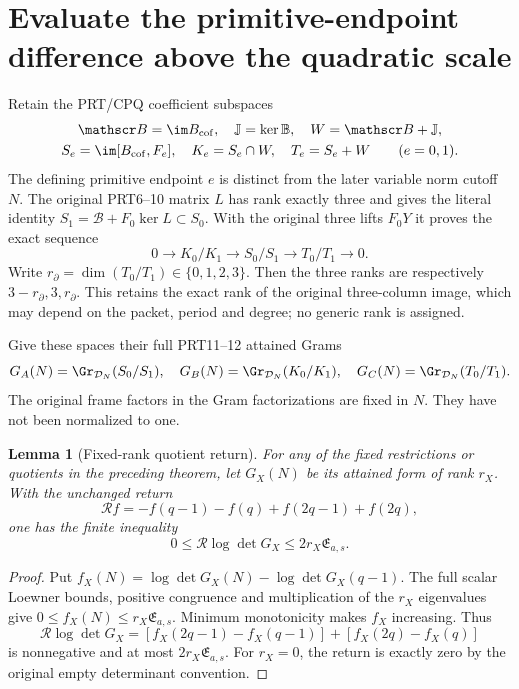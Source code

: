 \documentclass[11pt,a4paper]{article}
\newtheorem{lemma}[theorem]{Lemma}
\begin{document}
\section{Evaluate the primitive-endpoint difference above the quadratic scale}
Retain the PRT/CPQ coefficient subspaces
\begin{equation}
\begin{gathered}
 \mathscr B=\im B_{\rm cof},\quad \mathbb J=\ker\mathbb B,\quad
 W=\mathscr B+\mathbb J,\\
 S_e=\im[B_{\rm cof},F_e],\quad K_e=S_e\cap W,\quad
 T_e=S_e+W\qquad(e=0,1).
\end{gathered}\label{peq:peq:spaces}
\end{equation}
The defining primitive endpoint $e$ is distinct from the later variable norm cutoff $N$. The original PRT6--10 matrix $L$ has rank exactly three and gives the literal identity $S_1=\mathscr B+F_0\ker L\subset S_0$. With the original three lifts $F_0Y$ it proves the exact sequence
\begin{equation}
 0\longrightarrow K_0/K_1\longrightarrow S_0/S_1
            \longrightarrow T_0/T_1\longrightarrow0.
 \label{peq:peq:sequence}
\end{equation}
Write $r_\partial=\dim(T_0/T_1)\in\{0,1,2,3\}$. Then the three ranks are respectively $3-r_\partial,3,r_\partial$. This retains the exact rank of the original three-column image, which may depend on the packet, period and degree; no generic rank is assigned.

Give these spaces their full PRT11--12 attained Grams
\[
 G_A(N)=\Gr_{\mathcal D_N}(S_0/S_1),\quad
 G_B(N)=\Gr_{\mathcal D_N}(K_0/K_1),\quad
 G_C(N)=\Gr_{\mathcal D_N}(T_0/T_1).
\]
The original frame factors in the Gram factorizations are fixed in $N$. They have not been normalized to one.

\begin{lemma}[Fixed-rank quotient return]
For any of the fixed restrictions or quotients in the preceding theorem, let $G_X(N)$ be its attained form of rank $r_X$. With the unchanged return
\[
 \mathcal R f=-f(q-1)-f(q)+f(2q-1)+f(2q),
\]
one has the finite inequality
\begin{equation}
 \boxed{0\le\mathcal R\log\det G_X\le2r_X\mathfrak E_{a,s}.}
 \label{peq:peq:quotreturn}
\end{equation}
\end{lemma}
\begin{proof}
Put $f_X(N)=\log\det G_X(N)-\log\det G_X(q-1)$. The full scalar Loewner bounds, positive congruence and multiplication of the $r_X$ eigenvalues give
$0\le f_X(N)\le r_X\mathfrak E_{a,s}$. Minimum monotonicity makes $f_X$ increasing. Thus
\[
 \mathcal R\log\det G_X
       =[f_X(2q-1)-f_X(q-1)]+[f_X(2q)-f_X(q)]
\]
is nonnegative and at most $2r_X\mathfrak E_{a,s}$.
For $r_X=0$, the return is exactly zero by the original empty determinant convention.
\end{proof}
\end{document}
